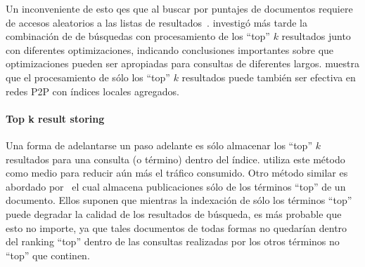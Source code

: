 Un inconveniente de esto qes que al buscar por puntajes de documentos requiere
de accesos aleatorios a las listas de resultados~\citealt{suel2003odissea}. %
\citealt{zhang2005efficient}
investigó más tarde la combinación de de búsquedas con procesamiento de los
``top'' $k$ resultados junto con diferentes optimizaciones, indicando
conclusiones importantes sobre que optimizaciones pueden ser apropiadas para
consultas de diferentes largos.
\citealt{balke2005progressive}
muestra que el procesamiento de sólo los ``top'' $k$ resultados puede también
ser efectiva en redes P2P con índices locales agregados.


\paragraph{Top k result storing~\cite{tang2004hybrid, skobeltsyn2006distributed, skobeltsyn2009query, skobeltsyn2007query}} %
Una forma de adelantarse un paso adelante es sólo almacenar los ``top'' $k$
resultados para una consulta (o término) dentro del índice.
\citealt{skobeltsyn2005distributed}%
utiliza este método como medio para reducir aún más el tráfico consumido.
Otro método similar es abordado por~\citealt{tang2004hybrid} %
el cual almacena publicaciones sólo de los términos ``top'' de un documento.
Ellos suponen que mientras la indexación de sólo los términos ``top'' puede
degradar la calidad de los resultados de búsqueda, es más probable que esto no
importe, ya que tales documentos de todas formas no quedarían dentro del ranking ``top''
dentro de las consultas realizadas por los otros términos no ``top'' que continen.
